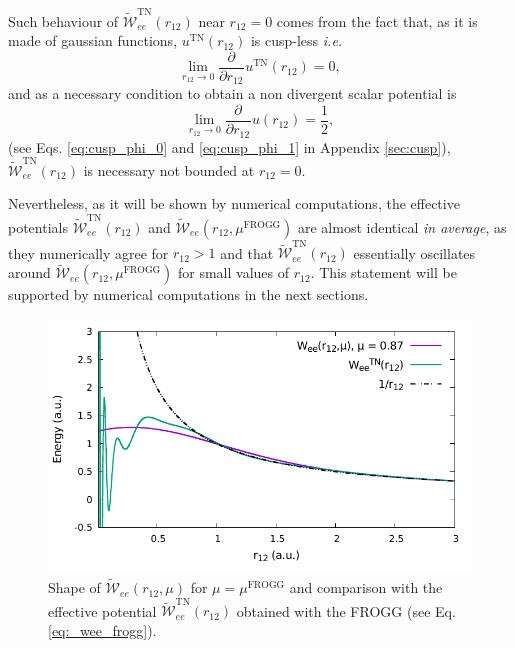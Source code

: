 \documentclass[aip,jcp,reprint,noshowkeys,superscriptaddress]{revtex4-1}
\newcommand{\deriv}[3]{\frac{\partial^{#3} #1}{\partial {#2}^{#3}}}
\newcommand{\mfrogg}[0]{\mu^\text{FROGG}}
\begin{document}
Such behaviour of $\tilde{\mathcal{W}}_{ee}^\text{TN}(r_{12})$ near $r_{12}=0$ comes from the fact that,
as it is made of gaussian functions, $u^{\text{TN}}(r_{12})$ is cusp-less \textit{i.e.} 
\begin{equation}
 \lim_{r_{12}\rightarrow 0} \deriv{}{r_{12}}{}u^{\text{TN}}(r_{12}) = 0, 
\end{equation}
and as a necessary condition to obtain a non divergent scalar potential is 
\begin{equation}
 \label{eq:cusp_phi_0}
 \lim_{r_{12}\rightarrow 0} \deriv{}{r_{12}}{}u(r_{12}) = \frac{1}{2}, 
\end{equation}
(see Eqs. \eqref{eq:cusp_phi_0}  and \eqref{eq:cusp_phi_1} in Appendix \ref{sec:cusp}), $\tilde{\mathcal{W}}_{ee}^\text{TN}(r_{12})$ is necessary not bounded at $r_{12}=0$.  

Nevertheless, as it will be shown by numerical computations, the effective potentials $\tilde{\mathcal{W}}_{ee}^\text{TN}(r_{12})$ and $\tilde{\mathcal{W}}_{ee}(r_{12},\mfrogg)$ are almost identical \textit{in average}, as they numerically agree for $r_{12}>1$ and that $\tilde{\mathcal{W}}_{ee}^\text{TN}(r_{12})$ essentially oscillates around $\tilde{\mathcal{W}}_{ee}(r_{12},\mfrogg)$ for small values of $r_{12}$. This statement will be supported by numerical computations in the next sections. 

\begin{figure}
 \label{fig_wee_frogg}
        \includegraphics[width=0.45\linewidth]{plots/jastrow/w_ee_frog.pdf}
        \caption{Shape of $\tilde{\mathcal{W}}_{ee}(r_{12},\mu)$ for $\mu=\mfrogg$ and comparison with the effective potential $\tilde{\mathcal{W}}_{ee}^\text{TN}(r_{12})$ obtained with the FROGG (see Eq.\eqref{eq:_wee_frogg}).}
\end{figure}
\end{document}

